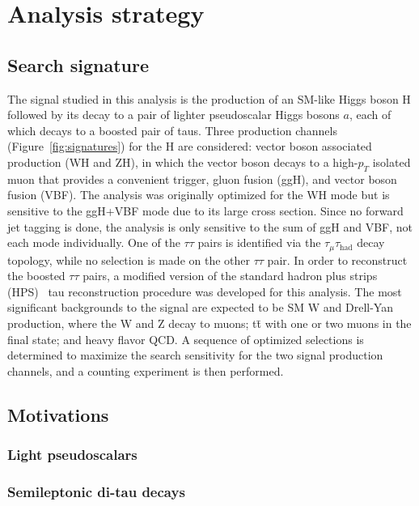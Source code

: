 \chapter{Analysis strategy\label{sec:strategy}}

\section{Search signature\label{sec:signature}}
The signal studied in this analysis is the production of an SM-like Higgs boson H followed by its decay to a pair of lighter pseudoscalar Higgs bosons $a$, each of which decays to a boosted pair of taus.  Three production channels (Figure~\ref{fig:signatures}) for the H are considered: vector boson associated production (WH and ZH), in which the vector boson decays to a high-$p_T$ isolated muon that provides a convenient trigger, gluon fusion (ggH), and vector boson fusion (VBF).  The analysis was originally optimized for the WH mode but is sensitive to the ggH+VBF mode due to its large cross section. Since no forward jet tagging is done, the analysis is only sensitive to the sum of ggH and VBF, not each mode individually.  One of the $\tau\tau$ pairs is identified via the $\tau_{\mu}\tau_{\text{had}}$ decay topology, while no selection is made on the other $\tau\tau$ pair.  In order to reconstruct the boosted $\tau\tau$ pairs, a modified version of the standard hadron plus strips (HPS)~\cite{CMS:2011msa} tau reconstruction procedure was developed for this analysis. The most significant backgrounds to the signal are expected to be SM W and Drell-Yan production, where the W and Z decay to muons; t\={t} with one or two muons in the final state; and heavy flavor QCD. A sequence of optimized selections is determined to maximize the search sensitivity for the two signal production channels, and a counting experiment is then performed.

\section{Motivations\label{sec:motivations}}

\subsection{Light pseudoscalars\label{sec:lighta}}

\subsection{Semileptonic di-tau decays\label{sec:semileptonic}}